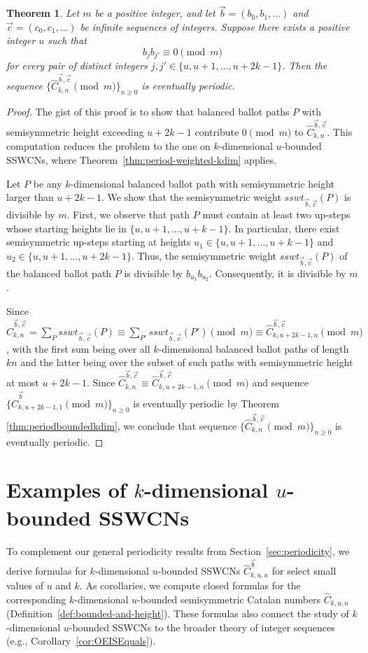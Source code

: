 \documentclass[11pt]{article}
\newtheorem{theorem}{Theorem}[section]
\theoremstyle{remark}
\theoremstyle{definition}
\begin{document}
\begin{theorem}\label{thm:Productperiodicity}
Let $m$ be a positive integer, and let $\vec b=(b_0,b_1,\dots)$ and $\vec c=(c_0,c_1,\dots)$ be infinite sequences of integers. Suppose there exists a positive integer $u$ such that
\[
b_j b_{j'} \equiv 0 \pmod m
\]
for every pair of distinct integers $j,j' \in \{u,u+1,\dots,u+2k-1\}$. Then the sequence $\{\widehat{C}^{\vec{b},\vec{c}}_{k,n} \pmod{m}\}_{n\ge 0}$ is eventually periodic.
\end{theorem}
\begin{proof}
The gist of this proof is to show that balanced ballot paths $P$ with semisymmetric height exceeding $u+2k-1$ contribute $0 \pmod{m}$ to $\widehat{C}_{k, n}^{\vec{b}, \vec{c}}$. This computation reduces the problem to the one on $k$-dimensional $u$-bounded SSWCNs, where Theorem~\ref{thm:period-weighted-kdim} applies. 

 Let $P$ be any $k$-dimensional balanced ballot path with semisymmetric height larger than $u+2k-1$. We show that the semisymmetric weight $sswt_{\vec{b}, \vec{c}}(P)$ is divisible by $m$. First, we observe that path $P$ must contain at least two up-steps whose starting heights lie in $\{u, u+1, \ldots, u+k-1\}$. In particular, there exist semisymmetric up-steps starting at heights $u_1 \in \{u,u+1,\ldots,u+k-1\}$ and $u_2 \in \{u,u+1,\ldots,u+2k-1\}$. Thus, the semisymmetric weight $sswt_{\vec{b}, \vec{c}}(P)$ of the balanced ballot path $P$ is divisible by $b_{u_1}b_{u_2}$. Consequently, it is divisible by $m$. 

Since $\widehat{C}_{k, n}^{\vec{b}, \vec{c}} = \sum_{P}sswt_{\vec{b}, \vec{c}}(P) \equiv  \sum_{P'}sswt_{\vec{b}, \vec{c}}(P')  \pmod{m} \equiv \widehat{C}_{k, u+2k-1, n}^{\vec{b}, \vec{c}} \pmod{m} $, with the first sum being over all $k$-dimensional balanced ballot paths of length $kn$ and the latter being over the subset of such paths with semisymmetric height at most $u+2k-1$.  Since $\widehat{C}_{k, n}^{\vec{b}, \vec{c}} \equiv  \widehat{C}_{k, u+2k-1, n}^{\vec{b}, \vec{c}} \pmod{m} $  and sequence $\{  \widehat{C}^{\vec{b}}_{k, u+2k-1, 1}  \pmod{m} \}_{n\geq 0}$ is eventually periodic by Theorem \ref{thm:periodboundedkdim}, we conclude that sequence $\{\widehat{C}_{k, n}^{\vec{b}, \vec{c}} \pmod{m}\}_{n \geq 0}$ is eventually periodic.
\end{proof}



\section{Examples of \texorpdfstring{$k$}{k}-dimensional \texorpdfstring{$u$}{u}-bounded SSWCNs}\label{sec:kuboundedweightedCatalan}
To complement our general periodicity results from Section~\ref{sec:periodicity}, we derive formulas for $k$-dimensional $u$-bounded SSWCNs $\widehat{C}_{k,u,n}^{\vec{b}}$ for select small values of $u$ and $k$. As corollaries, we compute closed formulas for the corresponding $k$-dimensional $u$-bounded semisymmetric Catalan numbers $\widehat{C}_{k,u,n}$ (Definition~\ref{def:bounded-and-height}). These formulas also connect the study of $k$-dimensional $u$-bounded SSWCNs to the broader theory of integer sequences (e.g., Corollary~\ref{cor:OEISEquals}).
\end{document}
